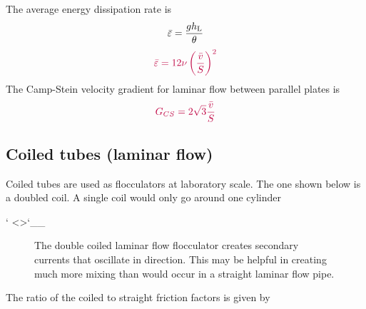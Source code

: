 \documentclass[letterpaper,10pt,english]{sphinxmanual}
\let\sphinxpxdimen\pdfpxdimen\else\newdimen\sphinxpxdimen
\begin{document}
The average energy dissipation rate is
\begin{equation}\label{equation:Rapid_Mix/RM_Derivations:Rapid_Mix/RM_Derivations:58}
\begin{split}\bar\varepsilon = \frac{gh_{\rm{L}}}{\theta}\end{split}
\end{equation}\begin{equation}\label{equation:Rapid_Mix/RM_Derivations:Rapid_Mix/RM_Derivations:59}
\begin{split}\color{purple}{
  \bar\varepsilon = 12 \nu \left(\frac{  \bar v}{S} \right)^2
  }\end{split}
\end{equation}
The Camp-Stein velocity gradient for laminar flow between parallel plates is
\begin{equation}\label{equation:Rapid_Mix/RM_Derivations:Rapid_Mix/RM_Derivations:60}
\begin{split}\color{purple}{
G_{CS} = 2\sqrt{3}\frac{  \bar v}{S}
}\end{split}
\end{equation}

\subsection{Coiled tubes (laminar flow)}
\label{\detokenize{Rapid_Mix/RM_Derivations:coiled-tubes-laminar-flow}}\label{\detokenize{Rapid_Mix/RM_Derivations:heading-coiled-tubes-laminar-flow}}
Coiled tubes are used as flocculators at laboratory scale. The one shown below is a doubled coil. A single coil would only go around one cylinder

{}` \textless{}\textgreater{}{}`\_\_

\begin{figure}[htbp]
\centering
\capstart

\noindent\sphinxincludegraphics[width=500\sphinxpxdimen]{{Coiled_tube_flocculator}.jpg}
\caption{The double coiled laminar flow flocculator creates secondary currents that oscillate in direction. This may be helpful in creating much more mixing than would occur in a straight laminar flow pipe.}\label{\detokenize{Rapid_Mix/RM_Derivations:id5}}\label{\detokenize{Rapid_Mix/RM_Derivations:figure-coiled-tube-flocculator}}\end{figure}

The ratio of the coiled to straight friction factors is given by 
\end{document}

